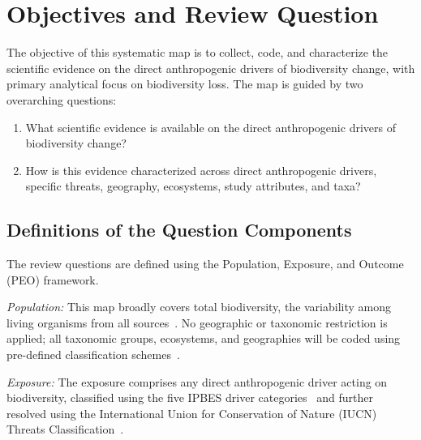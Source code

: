 \documentclass[12pt]{article}
\begin{document}
\section*{Objectives and Review Question}
The objective of this systematic map is to collect, code, and
characterize the scientific evidence on the direct anthropogenic drivers of biodiversity change, with primary analytical focus on biodiversity loss. The map is guided by two overarching questions:

\begin{enumerate}
  \sloppy 
  \item What scientific evidence is available on the direct anthropogenic drivers of biodiversity change?
  \item How is this evidence characterized across direct anthropogenic drivers, specific threats, geography, ecosystems, study attributes, and taxa?
\end{enumerate}

\subsection*{Definitions of the Question Components}
The review questions are defined using the Population, Exposure, and Outcome (PEO) framework.

\emph{Population:} This map broadly covers total biodiversity, the variability among living organisms from all sources~\cite{CBD1992}. No geographic or taxonomic restriction is applied; all taxonomic groups, ecosystems, and geographies will be coded using pre-defined classification schemes~\cite{diaz_ipbes_2015,iucn_threats_classification_2022,data_ipbes_geo,keith2022function_get,GBIFBackboneTaxonomy_general}.

\emph{Exposure:} The exposure comprises any direct anthropogenic driver acting on biodiversity, classified using the five IPBES driver categories~\cite{diaz_ipbes_2015} and further resolved using the International Union for Conservation of Nature (IUCN) Threats Classification~\cite{iucn_threats_classification_2022}.
\end{document}
